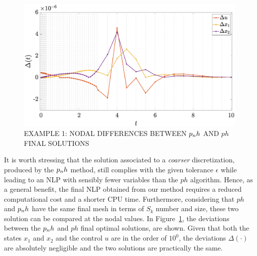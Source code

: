 \begin{figure}[t]
	\centering
	\includegraphics[trim={2cm 0.5cm 4cm 0.3cm},clip,width=1\columnwidth]{Img/delta_vanderpol}
	\caption{EXAMPLE 1: NODAL DIFFERENCES BETWEEN $p_{n}h$ AND $ph$ FINAL SOLUTIONS}
	\label{fig:deltavanderpol}
\end{figure}
It is worth stressing that the solution associated to a \emph{coarser} discretization, produced by the $p_{n}h$ method, still complies with the given tolerance $\epsilon$ while leading to an NLP with sensibly fewer variables than the $ph$ algorithm.
Hence, as a general benefit, the final NLP obtained from our method requires a reduced computational cost and a shorter CPU time.
Furthermore, considering that $ph$ and $p_{n}h$ have the same final mesh in terms of $S_k$ number and size, these two solution can be compared at the nodal values.
In Figure~\ref{fig:deltavanderpol}, the deviations between the $p_{n}h$ and $ph$ final optimal solutions, are shown.
Given that both the states $x_1$ and $x_2$ and the control $u$ are in the order of $10^{0}$, the deviations $\Delta(\cdot)$ are absolutely negligible and the two solutions are practically the same.

